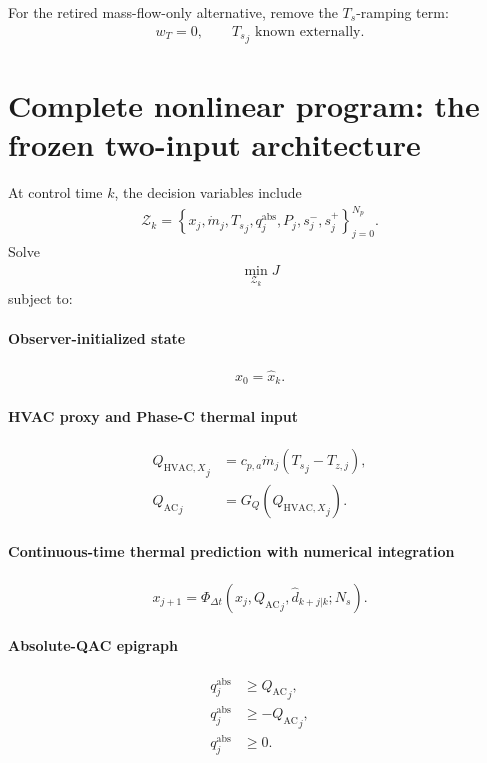 \documentclass[11pt]{article}
\newcommand{\Ts}{T_s}
\newcommand{\mdot}{\dot m}
\newcommand{\QAC}{Q_{\mathrm{AC}}}
\newcommand{\QHX}{Q_{\mathrm{HVAC},X}}
\begin{document}
For the retired mass-flow-only alternative, remove the \(T_s\)-ramping term:
\begin{align}
w_T=0,
\qquad
{\Ts}_j\text{ known externally.}
\tag{6.65}
\end{align}

\section{Complete nonlinear program: the frozen two-input architecture}

At control time \(k\), the decision variables include
\begin{align}
\mathcal Z_k
=
\left\{
x_j,\mdot_j,{\Ts}_j,
q_j^{\mathrm{abs}},P_j,s_j^-,s_j^+
\right\}_{j=0}^{N_p}.
\tag{6.66}
\end{align}
Solve
\begin{align}
\boxed{
\min_{\mathcal Z_k}J
}
\tag{6.67}
\end{align}
subject to:

\paragraph{Observer-initialized state}
\begin{align}
x_0=\widehat x_k.
\tag{6.68}
\end{align}

\paragraph{HVAC proxy and Phase-C thermal input}
\begin{align}
{\QHX}_j
&=
c_{p,a}\mdot_j({\Ts}_j-T_{z,j}),
\\
{\QAC}_j
&=
G_Q({\QHX}_j).
\tag{6.69}
\end{align}

\paragraph{Continuous-time thermal prediction with numerical integration}
\begin{align}
x_{j+1}
=
\Phi_{\Delta t}
\left(
x_j,{\QAC}_j,\widehat d_{k+j|k};N_s
\right).
\tag{6.70}
\end{align}

\paragraph{Absolute-QAC epigraph}
\begin{align}
q_j^{\mathrm{abs}}&\ge{\QAC}_j,
\\
q_j^{\mathrm{abs}}&\ge-{\QAC}_j,
\\
q_j^{\mathrm{abs}}&\ge0.
\tag{6.71}
\end{align}
\end{document}
